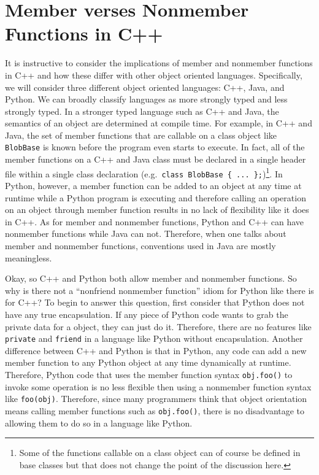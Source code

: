 \documentclass[pdf,ps2pdf,11pt]{SANDreport}
\begin{document}
%
\section{Member verses Nonmember Functions in C++}
%

It is instructive to consider the implications of member and nonmember
functions in C++ and how these differ with other object oriented languages.
Specifically, we will consider three different object oriented languages: C++,
Java, and Python.  We can broadly classify languages as more strongly typed
and less strongly typed.  In a stronger typed language such as C++ and Java,
the semantics of an object are determined at compile time.  For example, in
C++ and Java, the set of member functions that are callable on a class object
like {}\texttt{BlobBase} is known before the program even starts to execute.
In fact, all of the member functions on a C++ and Java class must be declared
in a single header file within a single class declaration (e.g.\
{}\texttt{class BlobBase \{ ... \};})\footnote{Some of the functions callable
on a class object can of course be defined in base classes but that does not
change the point of the discussion here.}.  In Python, however, a member
function can be added to an object at any time at runtime while a Python
program is executing and therefore calling an operation on an object through
member function results in no lack of flexibility like it does in C++.  As for
member and nonmember functions, Python and C++ can have nonmember functions
while Java can not.  Therefore, when one talks about member and nonmember
functions, conventions used in Java are mostly meaningless.

Okay, so C++ and Python both allow member and nonmember functions. So why is
there not a ``nonfriend nonmember function'' idiom for Python like there is
for C++?  To begin to answer this question, first consider that Python does
not have any true encapsulation.  If any piece of Python code wants to grab
the private data for a object, they can just do it.  Therefore, there are no
features like {}\texttt{private} and {}\texttt{friend} in a language like
Python without encapsulation.  Another difference between C++ and Python is
that in Python, any code can add a new member function to any Python object at
any time dynamically at runtime.  Therefore, Python code that uses the member
function syntax {}\texttt{obj.foo()} to invoke some operation is no less
flexible then using a nonmember function syntax like {}\texttt{foo(obj)}.
Therefore, since many programmers think that object orientation means calling
member functions such as {}\texttt{obj.foo()}, there is no disadvantage to
allowing them to do so in a language like Python.
\end{document}
